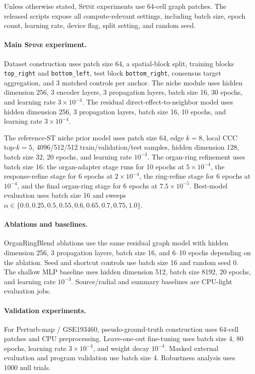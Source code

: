 \documentclass[sigconf,review,balance=false]{acmart}
\newcommand{\methodname}{\textsc{Spine}\xspace}
\begin{document}
Unless otherwise stated, \methodname{} experiments use 64-cell graph patches. The released scripts expose all compute-relevant settings, including batch size, epoch count, learning rate, device flag, split setting, and random seed.

\paragraph{Main \methodname{} experiment.}
Dataset construction uses patch size 64, a spatial-block split, training blocks \texttt{top\_right} and \texttt{bottom\_left}, test block \texttt{bottom\_right}, consensus target aggregation, and 3 matched controls per anchor. The niche module uses hidden dimension 256, 3 encoder layers, 3 propagation layers, batch size 16, 30 epochs, and learning rate $3\times10^{-4}$. The residual direct-effect-to-neighbor model uses hidden dimension 256, 3 propagation layers, batch size 16, 10 epochs, and learning rate $3\times10^{-4}$.

The reference-ST niche prior model uses patch size 64, edge $k=8$, local CCC top-$k=5$, 4096/512/512 train/validation/test samples, hidden dimension 128, batch size 32, 20 epochs, and learning rate $10^{-3}$. The organ-ring refinement uses batch size 16: the organ-adapter stage runs for 10 epochs at $5\times10^{-4}$, the response-refine stage for 6 epochs at $2\times10^{-4}$, the ring-refine stage for 6 epochs at $10^{-4}$, and the final organ-ring stage for 6 epochs at $7.5\times10^{-5}$. Best-model evaluation uses batch size 16 and sweeps $\alpha\in\{0.0,0.25,0.5,0.55,0.6,0.65,0.7,0.75,1.0\}$.

\paragraph{Ablations and baselines.}
OrganRingBlend ablations use the same residual graph model with hidden dimension 256, 3 propagation layers, batch size 16, and 6--10 epochs depending on the ablation. Seed and shortcut controls use batch size 16 and random seed 0. The shallow MLP baseline uses hidden dimension 512, batch size 8192, 20 epochs, and learning rate $10^{-3}$. Source/radial and summary baselines are CPU-light evaluation jobs.

\paragraph{Validation experiments.}
For Perturb-map / GSE193460, pseudo-ground-truth construction uses 64-cell patches and CPU preprocessing. Leave-one-out fine-tuning uses batch size 4, 80 epochs, learning rate $3\times10^{-4}$, and weight decay $10^{-4}$. Masked external evaluation and program validation use batch size 4. Robustness analysis uses 1000 null trials.
\end{document}
